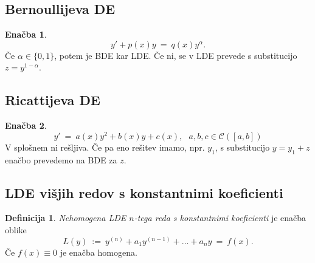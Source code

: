 \documentclass[11pt]{article}
\newcommand{\set}[1]{\{#1\}}
\newcommand{\0}{\mathbf{0}}
\theoremstyle{definition}
\newtheorem{definicija}{Definicija}[section]
\theoremstyle{definition}
\theoremstyle{definition}
\theoremstyle{definition}
\newtheorem{enacba}{Enačba}
\begin{document}

\subsection{Bernoullijeva DE}
\vspace{0.5cm}

\begin{enacba}

$$y' + p(x)y ~=~ q(x)y^{\alpha}.$$
Če $\alpha \in \set{0,1}$, potem je BDE kar LDE. Če ni, se v LDE prevede s substitucijo $z = y^{1-\alpha}$.

\end{enacba}
\vspace{0.5cm}


\subsection{Ricattijeva DE}
\vspace{0.5cm}

\begin{enacba}

$$y' ~=~ a(x)y^2 + b(x)y + c(x), ~~~a,b,c \in \mathcal{C}([a,b])$$
V splošnem ni rešljiva. Če pa eno rešitev imamo, npr. $y_1$, s substitucijo $y = y_1 + z$ enačbo prevedemo na BDE za $z$.

\end{enacba}
\vspace{0.5cm}


\subsection{LDE višjih redov s konstantnimi koeficienti}
\vspace{0.5cm}

\begin{definicija}

\textit{Nehomogena LDE $n$-tega reda s konstantnimi koeficienti} je enačba oblike
$$L(y) ~:=~ y^{(n)} + a_1 y^{(n-1)} + \ldots + a_n y ~=~ f(x).$$
Če $f(x) \equiv 0$ je enačba homogena.

\end{definicija}
\vspace{0.5cm}
\end{document}
